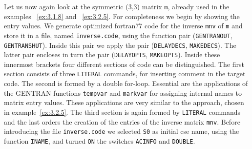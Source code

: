 \example\label{ex:8.2}

Let us now again look at the symmetric (3,3) matrix {\tt m}, already used in
the examples ~\ref{ex:3.1.8} and ~\ref{ex:3.2.5}. For completeness we begin
by showing the entry values. We generate optimized fortran77 code
for the inverse {\tt mnv} of {\tt m} and store it in a file,
named {\tt inverse.code}, using the function pair ({\tt GENTRANOUT},
{\tt GENTRANSHUT}). Inside this pair we apply the pair ({\tt DELAYDECS},
{\tt MAKEDECS}). The latter pair encloses in turn the pair ({\tt DELAYOPTS},
{\tt MAKEOPTS}). Inside these innermost brackets four different sections of
code can be distinguished. The first section consists of three {\tt LITERAL}
commands, for inserting comment in the target code. The second is formed by
a double for-loop.  Essential are the applications of the GENTRAN functions
{\tt tempvar} and {\tt markvar} for assigning internal names to matrix entry
values. These applications are very similar to the approach, chosen in
example~\ref{ex:3.2.5}. The third section is again formed by {\tt LITERAL}
commands and the last orders the creation of the entries of the inverse
matrix {\tt mnv}. Before introducing the file {\tt inverse.code} we selected
{\tt S0} as initial cse name, using the function {\tt INAME}, and
turned {\tt ON} the switches {\tt ACINFO} and {\tt DOUBLE}.

